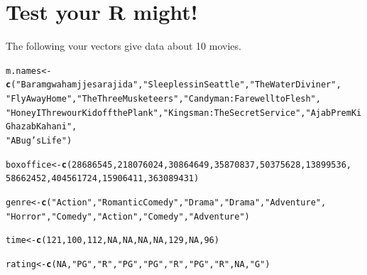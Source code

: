\documentclass{tufte-book}\usepackage[]{graphicx}\usepackage[]{color}
\makeatletter
\newcommand{\hlnum}[1]{\textcolor[rgb]{0.686,0.059,0.569}{#1}}%
\newcommand{\hlstr}[1]{\textcolor[rgb]{0.192,0.494,0.8}{#1}}%
\newcommand{\hlstd}[1]{\textcolor[rgb]{0.345,0.345,0.345}{#1}}%
\newcommand{\hlkwb}[1]{\textcolor[rgb]{0.69,0.353,0.396}{#1}}%
\newcommand{\hlkwd}[1]{\textcolor[rgb]{0.737,0.353,0.396}{\textbf{#1}}}%
\newenvironment{kframe}{%
 \def\at@end@of@kframe{}%
 \ifinner\ifhmode%
  \def\at@end@of@kframe{\end{minipage}}%
  \begin{minipage}{\columnwidth}%
 \fi\fi%
 \def\FrameCommand##1{\hskip\@totalleftmargin \hskip-\fboxsep
 \colorbox{shadecolor}{##1}\hskip-\fboxsep
     \hskip-\linewidth \hskip-\@totalleftmargin \hskip\columnwidth}%
 \MakeFramed {\advance\hsize-\width
   \@totalleftmargin\z@ \linewidth\hsize
   \@setminipage}}%
 {\par\unskip\endMakeFramed%
 \at@end@of@kframe}
\newenvironment{knitrout}{}{} %
\makeatother
\begin{document}
\section{Test your R might!}

The following vour vectors give data about 10 movies.

\begin{knitrout}
\color{fgcolor}\begin{kframe}
\begin{alltt}
\hlstd{m.names} \hlkwb{<-} \hlkwd{c}\hlstd{(}\hlstr{"Baramgwa hamjje sarajida"}\hlstd{,} \hlstr{"Sleepless in Seattle"}\hlstd{,} \hlstr{"The Water Diviner"}\hlstd{,}
\hlstr{"Fly Away Home"}\hlstd{,} \hlstr{"The Three Musketeers"}\hlstd{,} \hlstr{"Candyman: Farewell to Flesh"}\hlstd{,}
\hlstr{"Honey I Threw our Kid off the Plank"}\hlstd{,} \hlstr{"Kingsman: The Secret Service"}\hlstd{,} \hlstr{"Ajab Prem Ki Ghazab Kahani"}\hlstd{,}
\hlstr{"A Bug's Life"}\hlstd{)}

\hlstd{boxoffice} \hlkwb{<-} \hlkwd{c}\hlstd{(}\hlnum{28686545}\hlstd{,} \hlnum{218076024}\hlstd{,} \hlnum{30864649}\hlstd{,} \hlnum{35870837}\hlstd{,} \hlnum{50375628}\hlstd{,} \hlnum{13899536}\hlstd{,}
\hlnum{58662452}\hlstd{,} \hlnum{404561724}\hlstd{,} \hlnum{15906411}\hlstd{,} \hlnum{363089431}\hlstd{)}

\hlstd{genre} \hlkwb{<-} \hlkwd{c}\hlstd{(}\hlstr{"Action"}\hlstd{,} \hlstr{"Romantic Comedy"}\hlstd{,} \hlstr{"Drama"}\hlstd{,} \hlstr{"Drama"}\hlstd{,} \hlstr{"Adventure"}\hlstd{,}
\hlstr{"Horror"}\hlstd{,} \hlstr{"Comedy"}\hlstd{,} \hlstr{"Action"}\hlstd{,} \hlstr{"Comedy"}\hlstd{,} \hlstr{"Adventure"}\hlstd{)}

\hlstd{time} \hlkwb{<-} \hlkwd{c}\hlstd{(}\hlnum{121}\hlstd{,} \hlnum{100}\hlstd{,} \hlnum{112}\hlstd{,} \hlnum{NA}\hlstd{,} \hlnum{NA}\hlstd{,} \hlnum{NA}\hlstd{,} \hlnum{NA}\hlstd{,} \hlnum{129}\hlstd{,} \hlnum{NA}\hlstd{,} \hlnum{96}\hlstd{)}

\hlstd{rating} \hlkwb{<-} \hlkwd{c}\hlstd{(}\hlnum{NA}\hlstd{,} \hlstr{"PG"}\hlstd{,} \hlstr{"R"}\hlstd{,} \hlstr{"PG"}\hlstd{,} \hlstr{"PG"}\hlstd{,} \hlstr{"R"}\hlstd{,} \hlstr{"PG"}\hlstd{,} \hlstr{"R"}\hlstd{,} \hlnum{NA}\hlstd{,} \hlstr{"G"}\hlstd{)}
\end{alltt}
\end{kframe}
\end{knitrout}
\end{document}
